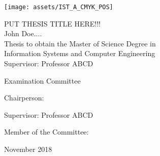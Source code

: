 \thispagestyle {empty}

\texttt{[image: assets/IST\_A\_CMYK\_POS]}

\begin{center}
%
\vspace{2.5cm}

\vspace{1.0cm}
{\FontLb PUT THESIS TITLE HERE!!!} \\
\vspace{2.7cm}
{\FontMb John Doe....} \\
\vspace{2.0cm}
{\FontSn Thesis to obtain the Master of Science Degree in} \\
\vspace{0.3cm}
{\FontLb Information Systems and Computer Engineering} \\
\vspace{1.1cm}
{\FontSn %
Supervisor: Professor ABCD
}

\vspace{1.1cm}

{\FontMb Examination Committee} \\

\vspace{0.3cm}

{\FontSn %
Chairperson: 

Supervisor: Professor ABCD

Member of the Committee: 

}

\vspace{1.5cm}
{\FontMb November 2018} \\
%
\end{center}

\cleardoublepage

